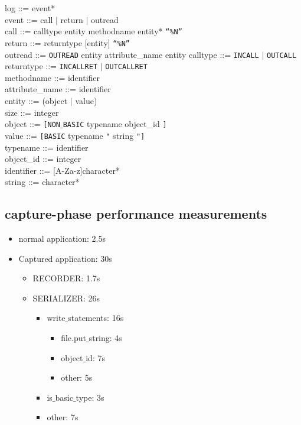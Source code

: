\documentclass[a4paper,twoside,10pt]{report}
\begin{document}
log ::= event* \\
event ::= call $\mid$ return $\mid$ outread\\
call ::= calltype entity methodname entity* \texttt{“\%N”} \\
return ::= returntype [entity]  \texttt{“\%N”}\\
outread ::= \texttt{OUTREAD} entity attribute\_name entity
calltype ::= \texttt{INCALL} $\mid$ \texttt{OUTCALL} \\
returntype ::= \texttt{INCALLRET} $\mid$ \texttt{OUTCALLRET} \\
methodname ::= identifier \\
attribute\_name ::= identifier \\
entity ::= (object $\mid$ value) \\
size ::= integer \\
object ::= \texttt{[NON$\_$BASIC} typename object\_id \texttt{]} \\
value ::= \texttt{[BASIC} typename \texttt{"} string \texttt{"]} \\
typename ::= identifier \\
object\_id ::= integer\\
identifier ::= [A-Za-z]character*\\
string ::= character*\\

\subsection{capture-phase performance measurements}
\begin{itemize}
	\item normal application: 2.5s
	\item Captured application: 30s
	\begin{itemize}
		\item RECORDER: 1.7s\\
		\item SERIALIZER: 26s
		\begin{itemize}
			\item write$\_$statements: 16s
			\begin{itemize}
				\item file.put$\_$string: 4s
				\item object$\_$id: 7s
				\item other: 5s
			\end{itemize}
			\item is$\_$basic$\_$type: 3s
			\item other: 7s
		\end{itemize}
	\end{itemize}
\end{itemize}

 

\end{document}

